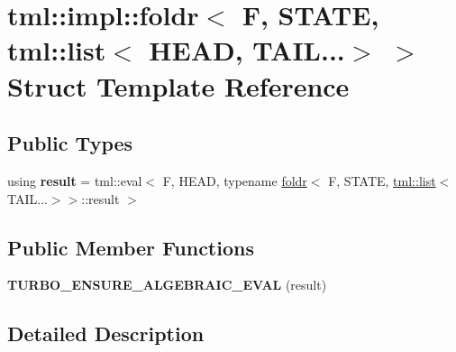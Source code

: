 \hypertarget{structtml_1_1impl_1_1foldr_3_01_f_00_01_s_t_a_t_e_00_01tml_1_1list_3_01_h_e_a_d_00_01_t_a_i_l_8_8_8_4_01_4}{\section{tml\+:\+:impl\+:\+:foldr$<$ F, S\+T\+A\+T\+E, tml\+:\+:list$<$ H\+E\+A\+D, T\+A\+I\+L...$>$ $>$ Struct Template Reference}
\label{structtml_1_1impl_1_1foldr_3_01_f_00_01_s_t_a_t_e_00_01tml_1_1list_3_01_h_e_a_d_00_01_t_a_i_l_8_8_8_4_01_4}
}
\subsection*{Public Types}
\begin{DoxyCompactItemize}
\item 
\hypertarget{structtml_1_1impl_1_1foldr_3_01_f_00_01_s_t_a_t_e_00_01tml_1_1list_3_01_h_e_a_d_00_01_t_a_i_l_8_8_8_4_01_4_a5e287ad078f869f460004bbb33f55fa1}{using {\bfseries result} = tml\+::eval$<$ F, H\+E\+A\+D, typename \hyperlink{structtml_1_1impl_1_1foldr}{foldr}$<$ F, S\+T\+A\+T\+E, \hyperlink{structtml_1_1list}{tml\+::list}$<$ T\+A\+I\+L...$>$$>$\+::result $>$}\label{structtml_1_1impl_1_1foldr_3_01_f_00_01_s_t_a_t_e_00_01tml_1_1list_3_01_h_e_a_d_00_01_t_a_i_l_8_8_8_4_01_4_a5e287ad078f869f460004bbb33f55fa1}

\end{DoxyCompactItemize}
\subsection*{Public Member Functions}
\begin{DoxyCompactItemize}
\item 
\hypertarget{structtml_1_1impl_1_1foldr_3_01_f_00_01_s_t_a_t_e_00_01tml_1_1list_3_01_h_e_a_d_00_01_t_a_i_l_8_8_8_4_01_4_a5eac1bc257c7ece1f90a678b5a285a15}{{\bfseries T\+U\+R\+B\+O\+\_\+\+E\+N\+S\+U\+R\+E\+\_\+\+A\+L\+G\+E\+B\+R\+A\+I\+C\+\_\+\+E\+V\+A\+L} (result)}\label{structtml_1_1impl_1_1foldr_3_01_f_00_01_s_t_a_t_e_00_01tml_1_1list_3_01_h_e_a_d_00_01_t_a_i_l_8_8_8_4_01_4_a5eac1bc257c7ece1f90a678b5a285a15}

\end{DoxyCompactItemize}


\subsection{Detailed Description}
